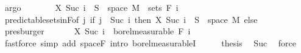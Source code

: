 \begin{isabellebody}
\ argo\isanewline
\ \ \ \ \isamarkupfalse%
\ \isamarkupfalse%
\ {\isachardoublequoteopen}X\ {\isacharparenleft}{\kern0pt}Suc\ i{\isacharparenright}{\kern0pt}\ {\isacharminus}{\kern0pt}{\isacharbackquote}{\kern0pt}\ S\ {\isasyminter}\ space\ M\ {\isasymin}\ sets\ {\isacharparenleft}{\kern0pt}F\ i{\isacharparenright}{\kern0pt}{\isachardoublequoteclose}\ \isamarkupfalse%
\ predictable{\isacharunderscore}{\kern0pt}sets{\isacharunderscore}{\kern0pt}in{\isacharunderscore}{\kern0pt}F{\isacharbrackleft}{\kern0pt}of\ {\isachardoublequoteopen}{\isasymlambda}j{\isachardot}{\kern0pt}\ if\ j\ {\isacharequal}{\kern0pt}\ Suc\ i\ then\ {\isacharparenleft}{\kern0pt}X\ {\isacharparenleft}{\kern0pt}Suc\ i{\isacharparenright}{\kern0pt}\ {\isacharminus}{\kern0pt}{\isacharbackquote}{\kern0pt}\ S\ {\isasyminter}\ space\ M{\isacharparenright}{\kern0pt}\ else\ {\isacharbraceleft}{\kern0pt}{\isacharbraceright}{\kern0pt}{\isachardoublequoteclose}{\isacharbrackright}{\kern0pt}\ \isamarkupfalse%
\ presburger\isanewline
\ \ \isacommand{{\isacharbraceright}{\kern0pt}}\isamarkupfalse%
\isanewline
\ \ \isamarkupfalse%
\ {\isachardoublequoteopen}X\ {\isacharparenleft}{\kern0pt}Suc\ i{\isacharparenright}{\kern0pt}\ {\isasymin}\ borel{\isacharunderscore}{\kern0pt}measurable\ {\isacharparenleft}{\kern0pt}F\ i{\isacharparenright}{\kern0pt}{\isachardoublequoteclose}\ \isamarkupfalse%
\ {\isacharparenleft}{\kern0pt}fastforce\ simp\ add{\isacharcolon}{\kern0pt}\ space{\isacharunderscore}{\kern0pt}F\ intro{\isacharbang}{\kern0pt}{\isacharcolon}{\kern0pt}\ borel{\isacharunderscore}{\kern0pt}measurableI{\isacharparenright}{\kern0pt}\isanewline
\ \ \isamarkupfalse%
\ \isamarkupfalse%
\ {\isacharquery}{\kern0pt}thesis\ \isamarkupfalse%
\ Suc\ \isamarkupfalse%
\ force\isanewline
{}\isamarkupfalse%
%
\endisatagproof
{\isafoldproof}%
%
\isadelimproof
\isanewline
%
\endisadelimproof
\isanewline
{}\isamarkupfalse%
\isanewline
%
\isadelimtheory
\isanewline
%
\endisadelimtheory
%
\isatagtheory
{}\isamarkupfalse%
%
\endisatagtheory
{\isafoldtheory}%
%
\isadelimtheory
%
\endisadelimtheory
%
\end{isabellebody}%
\endinput

